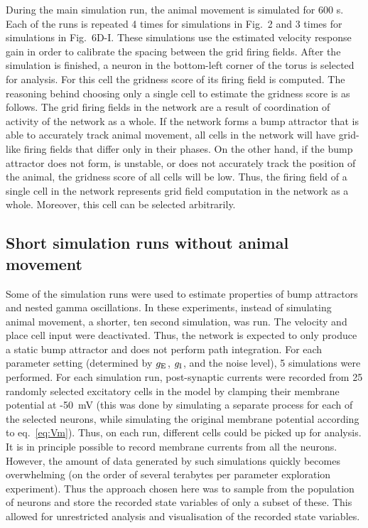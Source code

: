 \documentclass[a4paper,12pt]{article}
\newcommand{\ssc}[3]{\ensuremath{#1_{\text{#2}_{\text{#3}}}}}
\newcommand{\gE      }{\ssc{g}      {\scriptsize{E}}{}}
\newcommand{\gI      }{\ssc{g}      {\scriptsize{I}}{}}
\begin{document}
During the main simulation run, the animal movement is simulated for 600 s.
Each of the runs is repeated 4 times for simulations in Fig.~2 and 3 times
for simulations in Fig.~6D-I. These simulations use the estimated velocity
response gain in order to calibrate the spacing between the grid firing fields.
After the simulation is finished, a neuron in the bottom-left corner of the
torus is selected for analysis. For this cell the gridness score of its firing
field is computed. The reasoning behind choosing only a single cell to estimate
the gridness score is as follows. The grid firing fields in the network are a
result of coordination of activity of the network as a whole. If the network
forms a bump attractor that is able to accurately track animal movement, all
cells in the network will have grid-like firing fields that differ only in
their phases. On the other hand, if the bump attractor does not form, is
unstable, or does not accurately track the position of the animal, the gridness
score of all cells will be low.  Thus, the firing field of a single cell in the
network represents grid field computation in the network as a whole.  Moreover,
this cell can be selected arbitrarily.


\subsection{Short simulation runs without animal movement} \label{sec:noise_short_sims}

Some of the simulation runs were used to estimate properties of bump attractors
and nested gamma oscillations. 
In these experiments, instead of simulating animal movement, a shorter, ten
second simulation, was run. The velocity and place cell input were deactivated.
Thus, the network is expected to only produce a static bump attractor and does
not perform path integration. For each parameter setting (determined
by $\gE$, $\gI$, and the noise level), 5 simulations were performed.  For each
simulation run, post-synaptic currents were recorded from 25 randomly selected
excitatory cells in the model by clamping their membrane potential at
-50~mV (this was done by simulating a separate process for each of the selected
neurons, while simulating the original membrane potential according to
eq.~\eqref{eq:Vm}).
Thus, on each run, different cells could be
picked up for analysis. It is in principle possible to record membrane currents
from all the neurons. However, the amount of data generated by such simulations
quickly becomes overwhelming (on the order of several terabytes per
parameter exploration experiment). Thus the approach chosen here was to sample from
the population of neurons and store the recorded state variables of only a
subset of these. This allowed for unrestricted analysis and visualisation of
the recorded state variables.
\end{document}
